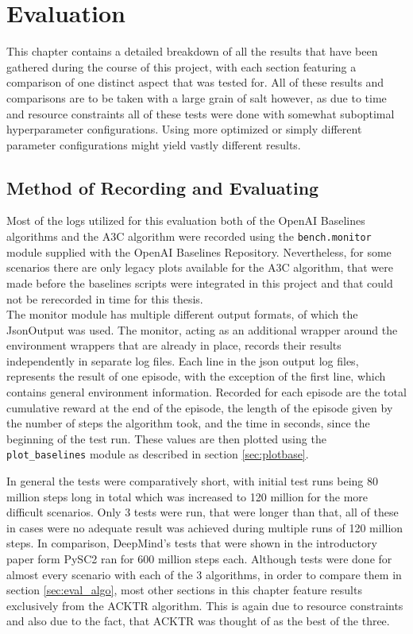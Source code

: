 
\chapter{Evaluation} %

\label{chap_eval} %

This chapter contains a detailed breakdown of all the results that have been gathered during the course of this project,
with each section featuring a comparison of one distinct aspect that was tested for. All of these results and comparisons are to be taken with a large grain of salt however, as due to time and resource constraints all of these tests were done with somewhat suboptimal hyperparameter configurations.
Using more optimized or simply different parameter configurations might yield vastly different results.
\section{Method of Recording and Evaluating}
Most of the logs utilized for this evaluation both of the OpenAI Baselines algorithms and the A3C algorithm were recorded using the \lstinline{bench.monitor} module supplied with the OpenAI Baselines Repository. Nevertheless, for some scenarios there are only legacy plots available for the A3C algorithm, that were made before the baselines scripts were integrated in this project and that could not be rerecorded in time for this thesis.\\ The monitor module has multiple different output formats, of which the JsonOutput was used. The monitor, acting as an additional wrapper around the environment wrappers that are already in place, records their results independently in separate log files. Each line in the json output log files, represents the result of one episode, with the exception of the first line, which contains general environment information. Recorded for each episode are the total cumulative reward at the end of the episode, the length of the episode given by the number of steps the algorithm took, and the time in seconds, since the beginning of the test run. These values are then plotted using the \lstinline{plot_baselines} module as described in section \ref{sec:plotbase}.

In general the tests were comparatively short, with initial test runs being 80 million steps long in total which was increased to 120 million for the more difficult scenarios. Only 3 tests were run, that were longer than that, all of these in cases were no adequate result was achieved during multiple runs of 120 million steps. In comparison, DeepMind's tests that were shown in the introductory paper form PySC2 ran for 600 million steps each. Although tests were done for almost every scenario with each of the 3 algorithms, in order to compare them in section \ref{sec:eval_algo}, most other sections in this chapter feature results exclusively from the ACKTR algorithm. This is again due to resource constraints and also due to the fact, that ACKTR was thought of as the best of the three.  


